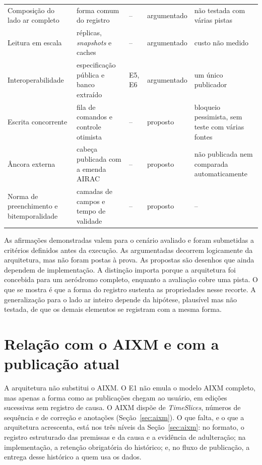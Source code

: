 \begin{table}[htbp]
\begin{tabularx}{\linewidth}{>{\raggedright\arraybackslash}p{2.75cm} >{\raggedright\arraybackslash}X l >{\raggedright\arraybackslash}p{2.2cm} >{\raggedright\arraybackslash}X}
        Composição do lado ar completo & forma comum do registro & -- & argumentado & não testada com várias pistas \\
        Leitura em escala & réplicas, \textit{snapshots} e caches & -- & argumentado & custo não medido \\
        Interoperabilidade & especificação pública e banco extraído & E5, E6 & argumentado & um único publicador \\
        Escrita concorrente & fila de comandos e controle otimista & -- & proposto & bloqueio pessimista, sem teste com várias fontes \\
        Âncora externa & cabeça publicada com a emenda AIRAC & -- & proposto & não publicada nem comparada automaticamente \\
        Norma de preenchimento e bitemporalidade & camadas de campos e tempo de validade & -- & proposto & -- \\
        \bottomrule
    \end{tabularx}
    \par{}
\end{table}

As afirmações demonstradas valem para o cenário avaliado e foram submetidas a critérios definidos antes da execução. As argumentadas decorrem logicamente da arquitetura, mas não foram postas à prova. As propostas são desenhos que ainda dependem de implementação. A distinção importa porque a arquitetura foi concebida para um aeródromo completo, enquanto a avaliação cobre uma pista. O que se mostra é que a forma do registro sustenta as propriedades nesse recorte. A generalização para o lado ar inteiro depende da hipótese, plausível mas não testada, de que os demais elementos se registram com a mesma forma.

\section{Relação com o AIXM e com a publicação atual}\label{sec:disc-aixm}

A arquitetura não substitui o AIXM. O E1 não emula o modelo AIXM completo, mas apenas a forma como as publicações chegam ao usuário, em edições sucessivas sem registro de causa. O AIXM dispõe de \textit{TimeSlices}, números de sequência e de correção e anotações (Seção~\ref{sec:aixm}). O que falta, e o que a arquitetura acrescenta, está nos três níveis da Seção~\ref{sec:aixm}: no formato, o registro estruturado das premissas e da causa e a evidência de adulteração; na implementação, a retenção obrigatória do histórico; e, no fluxo de publicação, a entrega desse histórico a quem usa os dados.

